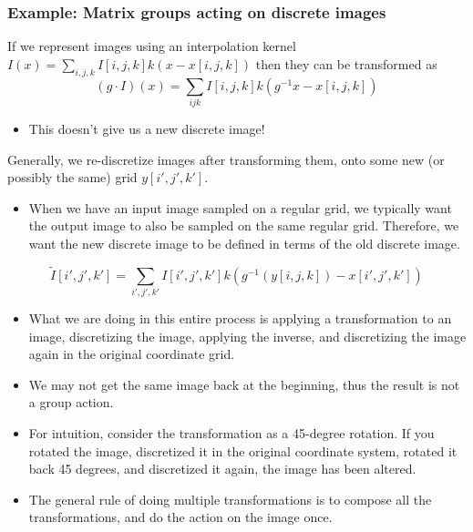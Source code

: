 \documentclass[10pt]{article}
\begin{document}
\subsubsection*{Example: Matrix groups acting on discrete images}
If we represent images using an interpolation kernel $I(x) = \sum_{i, j, k} I[i, j, k] k(x - x[i, j, k])$ then they can be transformed as
\[(g \cdot I)(x) = \sum_{ijk} I[i, j, k] k(g^{-1} x - x[i, j, k])\]
\begin{itemize}
    \item This doesn't give us a new discrete image!
\end{itemize}
Generally, we re-discretize images after transforming them, onto some new (or possibly the same) grid $y[i', j', k']$.
\begin{itemize}
    \item When we have an input image sampled on a regular grid, we typically want the output image to also be sampled on the same regular grid.  Therefore, we want the new discrete image to be defined in terms of the old discrete image.
\end{itemize}
\[\tilde{I}[i', j', k'] = \sum_{i', j', k'} I[i', j', k'] k(g^{-1} (y[i, j, k]) - x[i', j', k'])\]
\begin{itemize}
    \item What we are doing in this entire process is applying a transformation to an image, discretizing the image, applying the inverse, and discretizing the image again in the original coordinate grid.
    \item We may not get the same image back at the beginning, thus the result is not a group action.
    \item For intuition, consider the transformation as a 45-degree rotation.  If you rotated the image, discretized it in the original coordinate system, rotated it back 45 degrees, and discretized it again, the image has been altered.
    \item The general rule of doing multiple transformations is to compose all the transformations, and do the action on the image once.
\end{itemize}
\end{document}
